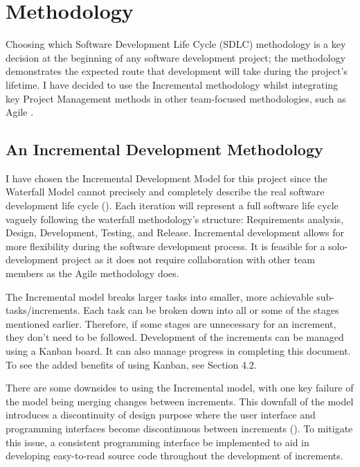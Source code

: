 \chapter{Methodology}
\label{chap:methodology}

Choosing which Software Development Life Cycle (SDLC) methodology is a key decision at the beginning of any software development project; the methodology demonstrates the expected route that development will take during the project's lifetime. I have decided to use the Incremental methodology whilst integrating key Project Management methods in other team-focused methodologies, such as Agile .

\section{An Incremental Development Methodology}
\label{methodology:chosen}

I have chosen the Incremental Development Model for this project since the Waterfall Model cannot precisely and completely describe the real software development life cycle (\cite{dapeng_liu_case_2011}).
Each iteration will represent a full software life cycle vaguely following the waterfall methodology's structure: Requirements analysis, Design, Development, Testing, and Release. Incremental development allows for more flexibility during the software development process. It is feasible for a solo-development project as it does not require collaboration with other team members as the Agile methodology does.

The Incremental model breaks larger tasks into smaller, more achievable sub-tasks/increments. Each task can be broken down into all or some of the stages mentioned earlier. Therefore, if some stages are unnecessary for an increment, they don't need to be followed. Development of the increments can be managed using a Kanban board. It can also manage progress in completing this document. To see the added benefits of using Kanban, see Section 4.2.

There are some downsides to using the Incremental model, with one key failure of the model being merging changes between increments. This downfall of the model introduces a discontinuity of design purpose where the user interface and programming interfaces become discontinuous between increments (\cite{dapeng_liu_case_2011}). To mitigate this issue, a consistent programming interface be implemented to aid in developing easy-to-read source code throughout the development of increments.